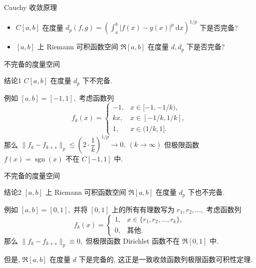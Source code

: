 
\begin{frame}{Cauchy 收敛原理}

\begin{question}
\begin{itemize}[<+->]
\item $C[a, b]$ 在度量 $d_p(f, g) = \left( \int_a^b \lvert f(x) - g(x) \rvert^p ~ \mathrm{d}x \right)^{1/p}$ 下是否完备?
\item $[a, b]$ 上 Riemann 可积函数空间 $\mathfrak{R}[a, b]$ 在度量 $d, d_p$ 下是否完备?
\end{itemize}
\end{question}

\end{frame}


\begin{frame}{不完备的度量空间}

\begin{block}{结论1}
$C[a, b]$ 在度量 $d_p$ 下不完备.
\end{block}

\pause
\vspace{1em}

例如 $[a, b] = [-1, 1],$ 考虑函数列
\[f_k(x) = \begin{cases}
-1, & x \in [-1, -1/k), \\
kx, & x \in [-1/k, 1/k], \\
1, & x \in (1/k, 1].
\end{cases}\]
那么 $\lVert f_k - f_{k+s} \rVert_p \leqslant \left(2 \cdot \dfrac{1}{k}\right)^{1/p} \to 0, ~ (k \to \infty)$ 但极限函数 $f(x) = \operatorname{sgn}(x)$ 不在 $C[-1, 1]$ 中.

\end{frame}


\begin{frame}{不完备的度量空间}

\begin{block}{结论2}
$[a, b]$ 上 Riemann 可积函数空间 $\mathfrak{R}[a, b]$ 在度量 $d_p$ 下也不完备.
\end{block}

\pause
\vspace{1em}

例如 $[a, b] = [0, 1],$ 并将 $[0, 1]$ 上的所有有理数写为 $r_1, r_2, \dots,$ 考虑函数列
\[f_k(x) = \begin{cases}
1, & x \in \{r_1, r_2, \dots, r_k\}, \\
0, & \text{其他}.
\end{cases}\]
那么 $\lVert f_k - f_{k+s} \rVert_p \equiv 0,$ 但极限函数 Dirichlet 函数不在 $\mathfrak{R}[0, 1]$ 中.

\pause
\vspace{1em}

{\color{red}但是}, $\mathfrak{R}[a, b]$ 在度量 $d$ 下是完备的, 这正是一致收敛函数列极限函数可积性定理.

\end{frame}

